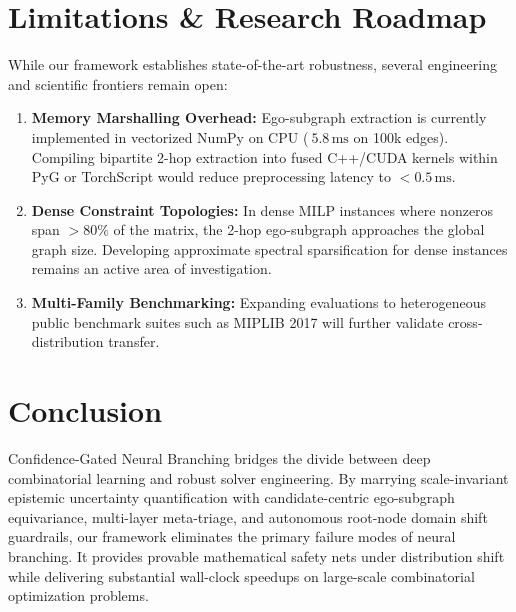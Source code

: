 \documentclass[10pt,twocolumn,letterpaper]{article}
\theoremstyle{plain}
\theoremstyle{definition}
\theoremstyle{remark}
\begin{document}
\section{Limitations \& Research Roadmap}
\label{sec:limitations}
While our framework establishes state-of-the-art robustness, several engineering and scientific frontiers remain open:
\begin{enumerate}
    \item \textbf{Memory Marshalling Overhead:} Ego-subgraph extraction is currently implemented in vectorized NumPy on CPU ($~5.8\,\text{ms}$ on 100k edges). Compiling bipartite 2-hop extraction into fused C++/CUDA kernels within PyG or TorchScript would reduce preprocessing latency to $<0.5\,\text{ms}$.
    \item \textbf{Dense Constraint Topologies:} In dense MILP instances where nonzeros span $>80\%$ of the matrix, the 2-hop ego-subgraph approaches the global graph size. Developing approximate spectral sparsification for dense instances remains an active area of investigation.
    \item \textbf{Multi-Family Benchmarking:} Expanding evaluations to heterogeneous public benchmark suites such as MIPLIB 2017 will further validate cross-distribution transfer.
\end{enumerate}

\section{Conclusion}
\label{sec:conclusion}
Confidence-Gated Neural Branching bridges the divide between deep combinatorial learning and robust solver engineering. By marrying scale-invariant epistemic uncertainty quantification with candidate-centric ego-subgraph equivariance, multi-layer meta-triage, and autonomous root-node domain shift guardrails, our framework eliminates the primary failure modes of neural branching. It provides provable mathematical safety nets under distribution shift while delivering substantial wall-clock speedups on large-scale combinatorial optimization problems.
\end{document}
